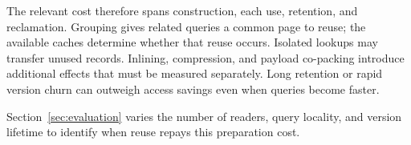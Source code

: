 The relevant cost therefore spans construction, each use, retention, and
reclamation. Grouping gives related queries a common page to reuse;
the available caches determine whether that reuse occurs. Isolated
lookups may transfer unused records. Inlining, compression, and payload co-packing
introduce additional effects that must be measured separately. Long
retention or rapid version churn can outweigh access savings even when
queries become faster.

Section~\ref{sec:evaluation} varies the number of readers, query locality,
and version lifetime to identify when reuse repays this preparation cost.
